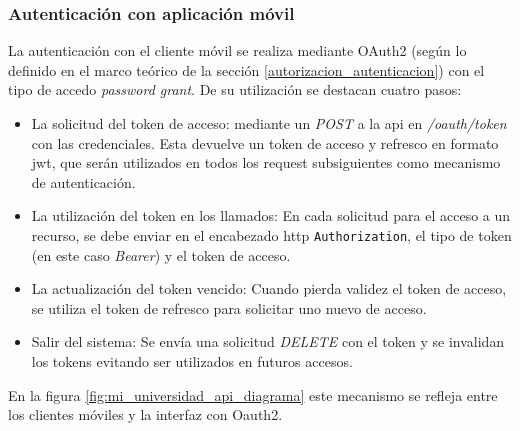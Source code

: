 \subsubsection{Autenticación con aplicación móvil}
\label{autenticacion_con_app}

La autenticación con el cliente móvil se realiza mediante OAuth2 (según lo definido en el marco teórico de la sección \ref{autorizacion_autenticacion}) con el tipo de accedo \textit{password grant}. De su utilización se destacan cuatro pasos:
\begin{itemize}
\item La solicitud del token de acceso: mediante un \textit{POST} a la \gls{api} en \textit{/oauth/token} con las credenciales. Esta devuelve un token de acceso y refresco en formato \gls{jwt}, que serán utilizados en todos los request subsiguientes como mecanismo de autenticación.
\item La utilización del token en los llamados: En cada solicitud para el acceso a un recurso, se debe enviar en el encabezado \gls{http} \lstinline{Authorization}, el tipo de token (en este caso \textit{Bearer}) y el token de acceso.
\item La actualización del token vencido: Cuando pierda validez el token de acceso, se utiliza el token de refresco para solicitar uno nuevo de acceso.
\item Salir del sistema: Se envía una solicitud \textit{DELETE} con el token y se invalidan los tokens evitando ser utilizados en futuros accesos.
\end{itemize}

En la figura \ref{fig:mi_universidad_api_diagrama} este mecanismo se refleja entre los clientes móviles y la interfaz con Oauth2.